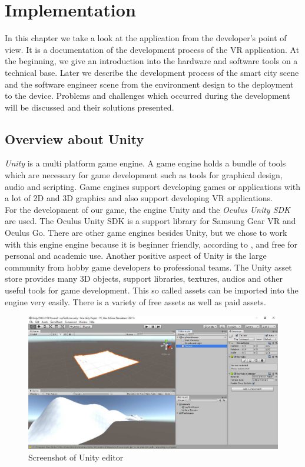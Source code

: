 \chapter{Implementation} \label{implementation}
In this chapter we take a look at the application from the developer's point of view. It is a documentation of the development process of the VR application. At the beginning, we give an introduction into the hardware and software tools on a technical base. Later we describe the development process of the smart city scene and the software engineer scene from the environment design to the deployment to the device. Problems and challenges which occurred during the development will be discussed and their solutions presented.

\section{Overview about Unity}
\textit{Unity} is a multi platform game engine. A game engine holds a bundle of tools which are necessary for game development such as tools for graphical design, audio and scripting. Game engines support developing games or applications with a lot of 2D and 3D graphics and also support developing VR applications. \cite{Dickson.2017}\\
For the development of our game, the engine Unity and the \textit{Oculus Unity SDK} are used. The Oculus Unity SDK is a support library for Samsung Gear VR and Oculus Go. There are other game engines besides Unity, but we chose to work with this engine engine because it is beginner friendly, according to \cite{Dickson.2017}, and free for personal and academic use. Another positive aspect of Unity is the large community from hobby game developers to professional teams. The Unity asset store provides many 3D objects, support libraries, textures, audios and other useful tools for game development. This so called assets can be imported into the engine very easily. There is a variety of free assets as well as paid assets.\\
\begin{figure}[h!]
  \includegraphics[width=16cm]{kapitel/eps/editor.pdf}
  \centering
  \caption{Screenshot of Unity editor}
  \label{fig:unity-editor}
\end{figure}
